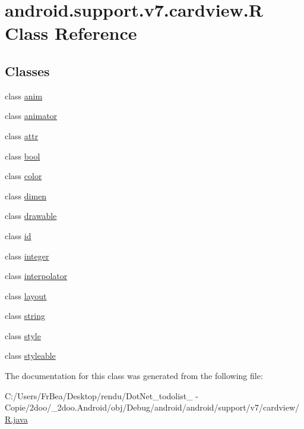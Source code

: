 \hypertarget{classandroid_1_1support_1_1v7_1_1cardview_1_1_r}{
\section{android.support.v7.cardview.R Class Reference}
\label{classandroid_1_1support_1_1v7_1_1cardview_1_1_r}
}
\subsection*{Classes}
\begin{CompactItemize}
\item 
class \hyperlink{classandroid_1_1support_1_1v7_1_1cardview_1_1_r_1_1anim}{anim}
\item 
class \hyperlink{classandroid_1_1support_1_1v7_1_1cardview_1_1_r_1_1animator}{animator}
\item 
class \hyperlink{classandroid_1_1support_1_1v7_1_1cardview_1_1_r_1_1attr}{attr}
\item 
class \hyperlink{classandroid_1_1support_1_1v7_1_1cardview_1_1_r_1_1bool}{bool}
\item 
class \hyperlink{classandroid_1_1support_1_1v7_1_1cardview_1_1_r_1_1color}{color}
\item 
class \hyperlink{classandroid_1_1support_1_1v7_1_1cardview_1_1_r_1_1dimen}{dimen}
\item 
class \hyperlink{classandroid_1_1support_1_1v7_1_1cardview_1_1_r_1_1drawable}{drawable}
\item 
class \hyperlink{classandroid_1_1support_1_1v7_1_1cardview_1_1_r_1_1id}{id}
\item 
class \hyperlink{classandroid_1_1support_1_1v7_1_1cardview_1_1_r_1_1integer}{integer}
\item 
class \hyperlink{classandroid_1_1support_1_1v7_1_1cardview_1_1_r_1_1interpolator}{interpolator}
\item 
class \hyperlink{classandroid_1_1support_1_1v7_1_1cardview_1_1_r_1_1layout}{layout}
\item 
class \hyperlink{classandroid_1_1support_1_1v7_1_1cardview_1_1_r_1_1string}{string}
\item 
class \hyperlink{classandroid_1_1support_1_1v7_1_1cardview_1_1_r_1_1style}{style}
\item 
class \hyperlink{classandroid_1_1support_1_1v7_1_1cardview_1_1_r_1_1styleable}{styleable}
\end{CompactItemize}


The documentation for this class was generated from the following file:\begin{CompactItemize}
\item 
C:/Users/FrBea/Desktop/rendu/DotNet\_\-todolist\_ - Copie/2doo/\_\-2doo.Android/obj/Debug/android/android/support/v7/cardview/\hyperlink{android_2support_2v7_2cardview_2_r_8java}{R.java}\end{CompactItemize}
